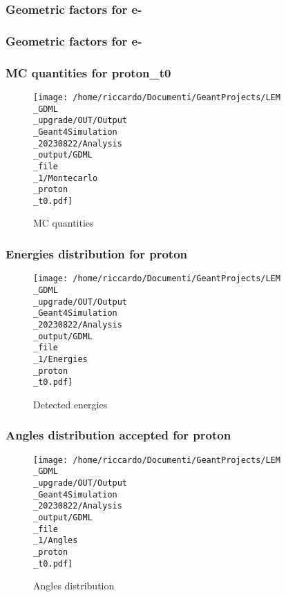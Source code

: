 \documentclass[8pt]{beamer}
\begin{document}
            \begin{frame}
                \frametitle{Geometric factors for e-}
            
            \end{frame}
            
            \begin{frame}
                \frametitle{Geometric factors for e-}
            
            \end{frame}
            
            \begin{frame}
                \frametitle{MC quantities for proton\_t0}
            
        \begin{figure}[h]
            \centering
            \texttt{[image: /home/riccardo/Documenti/GeantProjects/LEM\\\_GDML\\\_upgrade/OUT/Output\\\_Geant4Simulation\\\_20230822/Analysis\\\_output/GDML\\\_file\\\_1/Montecarlo\\\_proton\\\_t0.pdf]}
            \caption{MC quantities}
        \end{figure}
        
            \end{frame}
            
            \begin{frame}
                \frametitle{Energies distribution for proton}
            
        \begin{figure}[h]
            \centering
            \texttt{[image: /home/riccardo/Documenti/GeantProjects/LEM\\\_GDML\\\_upgrade/OUT/Output\\\_Geant4Simulation\\\_20230822/Analysis\\\_output/GDML\\\_file\\\_1/Energies\\\_proton\\\_t0.pdf]}
            \caption{Detected energies}
        \end{figure}
        
            \end{frame}
            
            \begin{frame}
                \frametitle{Angles distribution accepted for proton}
            
        \begin{figure}[h]
            \centering
            \texttt{[image: /home/riccardo/Documenti/GeantProjects/LEM\\\_GDML\\\_upgrade/OUT/Output\\\_Geant4Simulation\\\_20230822/Analysis\\\_output/GDML\\\_file\\\_1/Angles\\\_proton\\\_t0.pdf]}
            \caption{Angles distribution}
        \end{figure}
        
            \end{frame}
            
\end{document}

